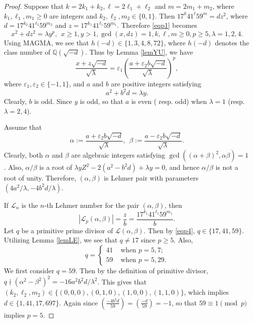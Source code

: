 \documentclass[12pt, 14paper,reqno]{amsart}
\theoremstyle{plain}
\theoremstyle{proof}
\numberwithin{equation}{section}
\begin{document}
\begin{proof}
Suppose that $k=2k_1+k_2, \ell=2\ell_1+\ell_2$ and $m=2m_1+m_2$, where $k_1,\ell_1, m_1\geq 0$ are integers and $k_2,\ell_2,m_2\in\{0,1\}$. Then 
$17^k41^\ell 59^m=dz^2$, where $d=17^{k_2}41^{\ell_2} 59^{m_2}$ and $z=17^{k_1}41^{\ell_1} 59^{m_1}$. 
Therefore \eqref{eqp1} becomes
$$x^2+dz^2=\lambda y^p, ~~x\geq 1, y>1, \gcd(x,dz)=1, k, \ell, m\geq 0, p\geq 5, \lambda =1, 2,4.$$
Using MAGMA, we see that $h(-d)\in\{1,3,4,8,72\}$, where $h(-d)$ denotes the class number of $\mathbb{Q}(\sqrt{-d})$.
Thus by Lemma \ref{lemYU}, we have
\begin{equation}\label{eqp2}
\frac{x+z\sqrt{-d}}{\sqrt{\lambda}}=\varepsilon_1\left(\frac{a+\varepsilon_2 b\sqrt{-d}}{\sqrt{\lambda}}\right)^p,
\end{equation} 
where $\varepsilon_1, \varepsilon_2\in\{-1, 1\}$, and $a$ and $b$ are positive integers satisfying
\begin{equation}\label{eqp3}
a^2+b^2d=\lambda y.
\end{equation}
Clearly, $b$ is odd. Since $y$ is odd, so that $a$ is even ( resp. odd) when $\lambda =1$ (resp. $\lambda = 2, 4$). 

Assume that $$\alpha:=\frac{a+\varepsilon_2 b\sqrt{-d}}{\sqrt{\lambda}},~~\beta:=\frac{a-\varepsilon_2 b\sqrt{-d}}{\sqrt{\lambda}}.$$
Clearly, both $\alpha$ and $\beta$ are algebraic integers satisfying $\gcd((\alpha+\beta)^2, \alpha\beta)=1$. Also, $\alpha/\beta$ is a root of $\lambda yZ^2-2(a^2-b^2d)+\lambda y=0$, and hence $\alpha/\beta$ is not a root of unity. Therefore, $(\alpha, \beta)$ is  Lehmer pair with parameters $(4a^2/\lambda, -4b^2d/\lambda)$. 

If $\mathcal{L}_n$ is the $n$-th Lehmer number for the pair $(\alpha, \beta)$, then 
\begin{equation}\label{eqp4}
|\mathcal{L}_p(\alpha, \beta)|=\frac{z}{b}=\frac{17^{k_1}41^{\ell_1} 59^{m_1}}{b}.
\end{equation}
Let $q$ be a primitive prime divisor of $\mathcal{L}(\alpha, \beta)$. Then by \eqref{eqp4}, $q\in\{17,41,59\}$. Utilizing Lemma \ref{lemLE}, we see that $q\ne 17$ since $p\geq 5$. Also, 
$$q=\begin{cases}
41 & \text{ when } p=5,7;\\
59 & \text{ when } p=5, 29.
\end{cases}
$$
We first consider $q=59$. Then by the definition of primitive divisor, $q\nmid (\alpha^2-\beta^2)^2=-16a^2b^2d/\lambda^2$. This gives that  $(k_2, \ell_2, m_2)\in\{(0,0,0), (0,1,0), (1,0,0), (1,1,0)\}$, which implies $d\in\{1,41,17, 697\}$. Again since $\left(\frac{-4b^2d}{59}\right)=\left(\frac{-d}{59}\right)=-1$, so that $59\equiv 1\pmod p$ implies $p=5$.


\end{proof}
\end{document}
